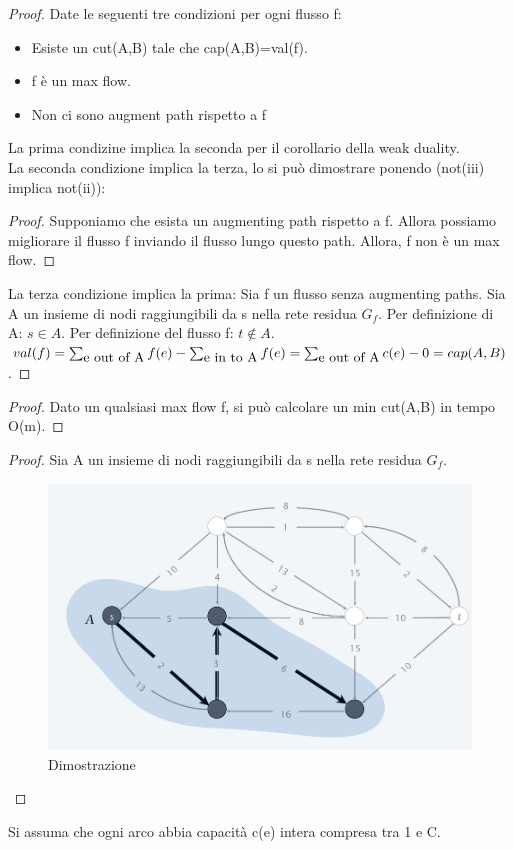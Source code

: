 \documentclass{article}
\begin{document}
\begin{proof}
     Date le seguenti tre condizioni per ogni flusso f:
    \begin{itemize}
        \item Esiste un cut(A,B) tale che cap(A,B)=val(f).
        \item f è un max flow.
        \item Non ci sono augment path rispetto a f
    \end{itemize}
    La prima condizine implica la seconda per il corollario della weak duality.\\
    La seconda condizione implica la terza, lo si può dimostrare ponendo (not(iii) implica not(ii)):
    \begin{proof}
        Supponiamo che esista un augmenting path rispetto a f. Allora possiamo migliorare il flusso f inviando il flusso lungo questo path.  Allora, f non è un max flow.
    \end{proof} 
    La terza condizione implica la prima: Sia f un flusso senza augmenting paths. Sia A un insieme di nodi raggiungibili da s nella rete residua $G_f$. Per definizione di A: $s\in A$. Per definizione del flusso f: $t\notin A$. \\$val(f)=\sum_{\mbox{e out of A}}f(e)-\sum_{\mbox{e in to A}}f(e)\\ =\sum_{\mbox{e out of A}}c(e)-0\\=cap(A,B)$.
\end{proof}
\begin{proof}
    Dato un qualsiasi max flow f, si può calcolare un min cut(A,B) in tempo O(m).
\end{proof}
\begin{proof}
    Sia A un insieme di nodi raggiungibili da s nella rete residua $G_f$.
\begin{figure}[H]
    \centering
    \includegraphics[width=0.5\linewidth]{Screenshot from 2024-04-26 18-51-13.png}
    \caption{Dimostrazione}
    \label{fig:enter-label}
\end{figure}
\end{proof}
Si assuma che ogni arco abbia capacità c(e) intera compresa tra 1 e C.\\
\end{document}
